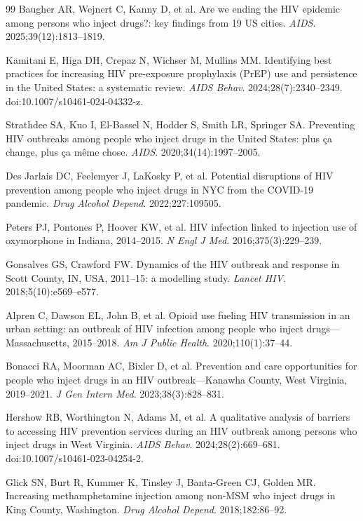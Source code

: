 \documentclass[12pt]{article}
\begin{document}
\begin{thebibliography}{99}
 Baugher AR, Wejnert C, Kanny D, et al. Are we ending the HIV epidemic among persons who inject drugs?: key findings from 19 US cities. \textit{AIDS}. 2025;39(12):1813--1819.

 Kamitani E, Higa DH, Crepaz N, Wichser M, Mullins MM. Identifying best practices for increasing HIV pre-exposure prophylaxis (PrEP) use and persistence in the United States: a systematic review. \textit{AIDS Behav}. 2024;28(7):2340--2349. doi:10.1007/s10461-024-04332-z.

 Strathdee SA, Kuo I, El-Bassel N, Hodder S, Smith LR, Springer SA. Preventing HIV outbreaks among people who inject drugs in the United States: plus ça change, plus ça même chose. \textit{AIDS}. 2020;34(14):1997--2005.

 Des Jarlais DC, Feelemyer J, LaKosky P, et al. Potential disruptions of HIV prevention among people who inject drugs in NYC from the COVID-19 pandemic. \textit{Drug Alcohol Depend}. 2022;227:109505.

 Peters PJ, Pontones P, Hoover KW, et al. HIV infection linked to injection use of oxymorphone in Indiana, 2014--2015. \textit{N Engl J Med}. 2016;375(3):229--239.

 Gonsalves GS, Crawford FW. Dynamics of the HIV outbreak and response in Scott County, IN, USA, 2011--15: a modelling study. \textit{Lancet HIV}. 2018;5(10):e569--e577.

 Alpren C, Dawson EL, John B, et al. Opioid use fueling HIV transmission in an urban setting: an outbreak of HIV infection among people who inject drugs---Massachusetts, 2015--2018. \textit{Am J Public Health}. 2020;110(1):37--44.

 Bonacci RA, Moorman AC, Bixler D, et al. Prevention and care opportunities for people who inject drugs in an HIV outbreak---Kanawha County, West Virginia, 2019--2021. \textit{J Gen Intern Med}. 2023;38(3):828--831.

 Hershow RB, Worthington N, Adams M, et al. A qualitative analysis of barriers to accessing HIV prevention services during an HIV outbreak among persons who inject drugs in West Virginia. \textit{AIDS Behav}. 2024;28(2):669--681. doi:10.1007/s10461-023-04254-2.

 Glick SN, Burt R, Kummer K, Tinsley J, Banta-Green CJ, Golden MR. Increasing methamphetamine injection among non-MSM who inject drugs in King County, Washington. \textit{Drug Alcohol Depend}. 2018;182:86--92.


\end{thebibliography}
\end{document}
